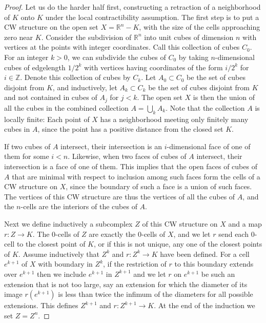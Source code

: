 \documentclass{article}
\theoremstyle{definition}
\begin{document}
\begin{proof}
Let us do the harder half first, constructing a retraction of a neighborhood of $K$ onto $K$ under the local contractibility assumption. The first step is to put a CW structure on the open set $X = \mathbb{R}^n - K$, with the size of the cells approaching zero near $K$. Consider the subdivision of $\mathbb{R}^n$ into unit cubes of dimension $n$ with vertices at the points with integer coordinates. Call this collection of cubes $C_0$. For an integer $k > 0$, we can subdivide the cubes of $C_0$ by taking $n$-dimensional cubes of edgelength $1/2^k$ with vertices having coordinates of the form $i/2^k$ for $i \in \mathbb{Z}$. Denote this collection of cubes by $C_k$. Let $A_0 \subset C_0$ be the set of cubes disjoint from $K$, and inductively, let $A_k \subset C_k$ be the set of cubes disjoint from $K$ and not contained in cubes of $A_j$ for $j < k$. The open set $X$ is then the union of all the cubes in the combined collection $A = \bigcup_k A_k$. Note that the collection $A$ is locally finite: Each point of $X$ has a neighborhood meeting only finitely many cubes in $A$, since the point has a positive distance from the closed set $K$.

If two cubes of $A$ intersect, their intersection is an $i$-dimensional face of one of them for some $i < n$. Likewise, when two faces of cubes of $A$ intersect, their intersection is a face of one of them. This implies that the open faces of cubes of $A$ that are minimal with respect to inclusion among such faces form the cells of a CW structure on $X$, since the boundary of such a face is a union of such faces. The vertices of this CW structure are thus the vertices of all the cubes of $A$, and the $n$-cells are the interiors of the cubes of $A$.

Next we define inductively a subcomplex $Z$ of this CW structure on $X$ and a map $r: Z \to K$. The 0-cells of $Z$ are exactly the 0-cells of $X$, and we let $r$ send each 0-cell to the closest point of $K$, or if this is not unique, any one of the closest points of $K$. Assume inductively that $Z^k$ and $r: Z^k \to K$ have been defined. For a cell $e^{k+1}$ of $X$ with boundary in $Z^k$, if the restriction of $r$ to this boundary extends over $e^{k+1}$ then we include $e^{k+1}$ in $Z^{k+1}$ and we let $r$ on $e^{k+1}$ be such an extension that is not too large, say an extension for which the diameter of its image $r(e^{k+1})$ is less than twice the infimum of the diameters for all possible extensions. This defines $Z^{k+1}$ and $r: Z^{k+1} \to K$. At the end of the induction we set $Z = Z^n$.


\end{proof}
\end{document}
